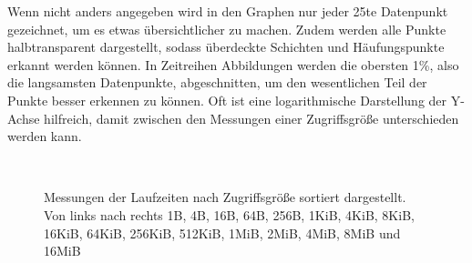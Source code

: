 \documentclass[
	12pt,
	a4paper,
	BCOR10mm,
	DIV14,
	listof=totoc,
	bibliography=totoc,
	headsepline
]{scrreprt}
\begin{document}
Wenn nicht anders angegeben wird in den Graphen nur jeder 25te Datenpunkt gezeichnet, um es etwas übersichtlicher zu machen.
Zudem werden alle Punkte halbtransparent dargestellt, sodass überdeckte Schichten und Häufungspunkte erkannt werden können.
In Zeitreihen Abbildungen werden die obersten 1\%, also die langsamsten Datenpunkte, abgeschnitten, um den wesentlichen Teil der Punkte besser erkennen zu können.
Oft ist eine logarithmische Darstellung der Y-Achse hilfreich, damit zwischen den Messungen einer Zugriffsgröße unterschieden werden kann. 

\begin{figure}
	\hfill
	\\
	\hfill
	\caption{Messungen der Laufzeiten nach Zugriffsgröße sortiert dargestellt. Von links nach rechts 1B, 4B, 16B, 64B, 256B, 1KiB, 4KiB, 8KiB, 16KiB, 64KiB, 256KiB, 512KiB, 1MiB, 2MiB, 4MiB, 8MiB und 16MiB}
	\label{Laufzeiten_Zeitreihe}
\end{figure} 
\end{document}
